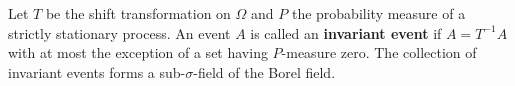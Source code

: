 Let $T$ be the shift transformation on $\Omega$ and $P$ the probability measure of a strictly stationary process. An event $A$ is called an \textbf{invariant event} if $A = T^{-1}A$ with at most the exception of a set having $P$-measure zero. The collection of invariant events forms a sub-$\sigma$-field of the Borel field.
